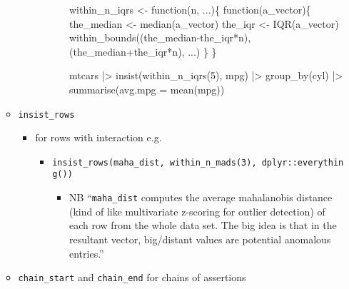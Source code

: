 \documentclass[
  letterpaper,
  DIV=11,
  numbers=noendperiod,
  oneside]{scrreprt}
\newenvironment{Shaded}{\begin{snugshade}}{\end{snugshade}}
\newcommand{\AttributeTok}[1]{\textcolor[rgb]{0.40,0.45,0.13}{#1}}
\newcommand{\ControlFlowTok}[1]{\textcolor[rgb]{0.00,0.23,0.31}{#1}}
\newcommand{\DecValTok}[1]{\textcolor[rgb]{0.68,0.00,0.00}{#1}}
\newcommand{\FunctionTok}[1]{\textcolor[rgb]{0.28,0.35,0.67}{#1}}
\newcommand{\NormalTok}[1]{\textcolor[rgb]{0.00,0.23,0.31}{#1}}
\newcommand{\OtherTok}[1]{\textcolor[rgb]{0.00,0.23,0.31}{#1}}
\newcommand{\SpecialCharTok}[1]{\textcolor[rgb]{0.37,0.37,0.37}{#1}}
\providecommand{\tightlist}{%
  \setlength{\itemsep}{0pt}\setlength{\parskip}{0pt}}\usepackage{longtable,booktabs,array}
\begin{document}
\begin{itemize}
\begin{itemize}
\begin{itemize}
\begin{itemize}
\begin{itemize}
\begin{Shaded}
\begin{Highlighting}[]
\NormalTok{within\_n\_iqrs }\OtherTok{\textless{}{-}} \ControlFlowTok{function}\NormalTok{(n, ...)\{}
  \ControlFlowTok{function}\NormalTok{(a\_vector)\{}
\NormalTok{    the\_median }\OtherTok{\textless{}{-}} \FunctionTok{median}\NormalTok{(a\_vector)}
\NormalTok{    the\_iqr }\OtherTok{\textless{}{-}} \FunctionTok{IQR}\NormalTok{(a\_vector)}
    \FunctionTok{within\_bounds}\NormalTok{((the\_median}\SpecialCharTok{{-}}\NormalTok{the\_iqr}\SpecialCharTok{*}\NormalTok{n), (the\_median}\SpecialCharTok{+}\NormalTok{the\_iqr}\SpecialCharTok{*}\NormalTok{n), ...)}
\NormalTok{  \}}
\NormalTok{\}}

\NormalTok{mtcars }\SpecialCharTok{|\textgreater{}} 
  \FunctionTok{insist}\NormalTok{(}\FunctionTok{within\_n\_iqrs}\NormalTok{(}\DecValTok{5}\NormalTok{), mpg)  }\SpecialCharTok{|\textgreater{}} 
  \FunctionTok{group\_by}\NormalTok{(cyl) }\SpecialCharTok{|\textgreater{}} 
  \FunctionTok{summarise}\NormalTok{(}\AttributeTok{avg.mpg =} \FunctionTok{mean}\NormalTok{(mpg))}
\end{Highlighting}
\end{Shaded}
        \end{itemize}
      \end{itemize}
    \end{itemize}
  \item
    \texttt{insist\_rows}

    \begin{itemize}
    \item
      for rows with interaction e.g.

      \begin{itemize}
      \item
        \texttt{insist\_rows(maha\_dist,\ within\_n\_mads(3),\ dplyr::everything())}

        \begin{itemize}
        \tightlist
        \item
          NB ``\texttt{maha\_dist} computes the average mahalanobis
          distance (kind of like multivariate z-scoring for outlier
          detection) of each row from the whole data set. The big idea
          is that in the resultant vector, big/distant values are
          potential anomalous entries.''
        \end{itemize}
      \end{itemize}
    \end{itemize}
  \item
    \texttt{chain\_start} and \texttt{chain\_end} for chains of
    assertions


\end{itemize}
\end{itemize}
\end{document}
